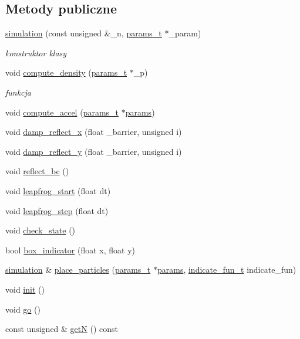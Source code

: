 \subsection*{Metody publiczne}
\begin{DoxyCompactItemize}
\item 
\hyperlink{classsimulation_a30fdcc611ae9a656a3aebb8445e4607d}{simulation} (const unsigned \&\-\_\-n, \hyperlink{structparams__t}{params\-\_\-t} $\ast$\-\_\-param)
\begin{DoxyCompactList}\small\item\em konstruktor klasy \end{DoxyCompactList}\item 
void \hyperlink{classsimulation_a311b1405c73090e5f82891e35ddee975}{compute\-\_\-density} (\hyperlink{structparams__t}{params\-\_\-t} $\ast$\-\_\-p)
\begin{DoxyCompactList}\small\item\em funkcja \end{DoxyCompactList}\item 
void \hyperlink{classsimulation_a2ef9f4e969452551babc02a311f4442c}{compute\-\_\-accel} (\hyperlink{structparams__t}{params\-\_\-t} $\ast$\hyperlink{classsimulation_a861b82cc3c0e7e58abfba464a133dae3}{params})
\item 
void \hyperlink{classsimulation_a2668bf704b28e3c0abe405ab12bd10b7}{damp\-\_\-reflect\-\_\-x} (float \-\_\-barrier, unsigned i)
\item 
void \hyperlink{classsimulation_a1322c3c317601efbe751747f19f5cafa}{damp\-\_\-reflect\-\_\-y} (float \-\_\-barrier, unsigned i)
\item 
void \hyperlink{classsimulation_a6f0b34625a4ef21e7b9c7c960bb91c4b}{reflect\-\_\-bc} ()
\item 
void \hyperlink{classsimulation_af9dbe76734d2efdbddc7da64eeb91968}{leapfrog\-\_\-start} (float dt)
\item 
void \hyperlink{classsimulation_a8acf4a82697573cb4ae6b1be6a8d30a7}{leapfrog\-\_\-step} (float dt)
\item 
void \hyperlink{classsimulation_a6997cb4eeae3330e93916cb05fea5efe}{check\-\_\-state} ()
\item 
bool \hyperlink{classsimulation_a98d5516416b67721c545ae7b88d74114}{box\-\_\-indicator} (float x, float y)
\item 
\hyperlink{classsimulation}{simulation} \& \hyperlink{classsimulation_a66aa4b9fae7d660028ed8972ebf20a91}{place\-\_\-particles} (\hyperlink{structparams__t}{params\-\_\-t} $\ast$\hyperlink{classsimulation_a861b82cc3c0e7e58abfba464a133dae3}{params}, \hyperlink{classsimulation_ab63cd8ab861eb5f0096982628dca37dc}{indicate\-\_\-fun\-\_\-t} indicate\-\_\-fun)
\item 
void \hyperlink{classsimulation_a2e12616e089dd7f9742c25933bf630ef}{init} ()
\item 
void \hyperlink{classsimulation_a6d1112d250e89120ac05cf9f42f7d8d7}{go} ()
\item 
const unsigned \& \hyperlink{classsimulation_abe09252527aa58fbec8144063be3e950}{get\-N} () const 
\end{DoxyCompactItemize}
